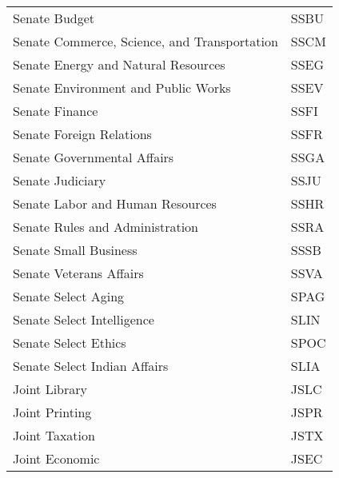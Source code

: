 \documentclass[10pt,a4paper]{article}
\begin{document}
\begin{table}
\begin{tabular}{ll}
\rowcolor{gray!30}
Senate Budget	&	SSBU	\\
Senate Commerce, Science, and Transportation	&	SSCM	\\
\rowcolor{gray!30}
Senate Energy and Natural Resources	&	SSEG	\\
Senate Environment and Public Works	&	SSEV	\\
\rowcolor{gray!30}
Senate Finance	&	SSFI	\\
Senate Foreign Relations	&	SSFR	\\
\rowcolor{gray!30}
Senate Governmental Affairs	&	SSGA	\\
Senate Judiciary	&	SSJU	\\
\rowcolor{gray!30}
Senate Labor and Human Resources	&	SSHR	\\
Senate Rules and Administration	&	SSRA	\\
\rowcolor{gray!30}
Senate Small Business	&	SSSB	\\
Senate Veterans Affairs	 &	SSVA	\\
\rowcolor{gray!30}
Senate Select Aging	&	SPAG	\\
Senate Select Intelligence	&	SLIN	\\
\rowcolor{gray!30}
Senate Select Ethics	&	SPOC	\\
Senate Select Indian Affairs	&	SLIA	\\
\rowcolor{gray!30}
Joint Library	&	JSLC 	\\
Joint Printing	&	JSPR	 \\
\rowcolor{gray!30}
Joint Taxation	&	JSTX	\\
Joint Economic	&	JSEC	\\
\end{tabular}
\end{table}
\end{document}
